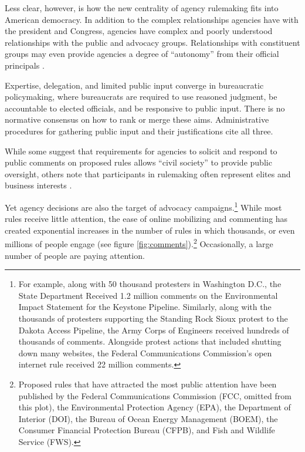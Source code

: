 Less clear, however, is how the new centrality of agency rulemaking fits into American democracy. In addition to the complex relationships agencies have with the president and Congress, agencies have complex and poorly understood relationships with the public and advocacy groups. Relationships with constituent groups may even provide agencies a degree of ``autonomy'' from their official principals \citep{Carpenter2001}. 

Expertise, delegation, and limited public input converge in bureaucratic policymaking, where bureaucrats are required to use reasoned judgment, be accountable to elected officials, and be responsive to public input. There is no normative consensus on how to rank or merge these aims.
Administrative procedures for gathering public input and their justifications cite all three.

While some suggest that requirements for agencies to solicit and respond to public comments on proposed rules allows ``civil society'' to provide public oversight, others note that participants in rulemaking often represent elites \citep{Seifter2016UCLA} and business interests \citep{Yackee2006JOP}. 

Yet agency decisions are also the target of advocacy campaigns.\footnote{For example, along with 50 thousand protesters in Washington D.C., the State Department Received 1.2 million comments on the Environmental Impact Statement for the Keystone Pipeline. Similarly, along with the thousands of protesters supporting the Standing Rock Sioux protest to the Dakota Access Pipeline, the Army Corps of Engineers received hundreds of thousands of comments. Alongside protest actions that included shutting down many websites, the Federal Communications Commission's open internet rule received 22 million comments. %
} 
While most rules receive little attention, the ease of online mobilizing and commenting has created exponential increases in the number of rules in which thousands, or even millions of people engage (see figure \ref{fig:comments}).\footnote{Proposed rules that have attracted the most public attention have been published by the Federal Communications Commission (FCC, omitted from this plot), the Environmental Protection Agency (EPA), the Department of Interior (DOI), the Bureau of Ocean Energy Management (BOEM), the Consumer Financial Protection Bureau (CFPB), and Fish and Wildlife Service (FWS).} Occasionally, a large number of people are paying attention.

